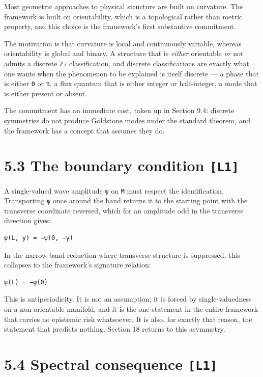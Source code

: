 \documentclass[
  11pt]{report}
\begin{document}
Most geometric approaches to physical structure are built on curvature.
The framework is built on orientability, which is a topological rather
than metric property, and this choice is the framework's first
substantive commitment.

The motivation is that curvature is local and continuously variable,
whereas orientability is global and binary. A structure that is
\emph{either} orientable \emph{or} not admits a discrete \texttt{ℤ₂}
classification, and discrete classifications are exactly what one wants
when the phenomenon to be explained is itself discrete --- a phase that
is either \texttt{0} or \texttt{π}, a flux quantum that is either
integer or half-integer, a mode that is either present or absent.

The commitment has an immediate cost, taken up in Section 9.4: discrete
symmetries do not produce Goldstone modes under the standard theorem,
and the framework has a concept that assumes they do.

\hypertarget{the-boundary-condition-l1}{%
\section{\texorpdfstring{5.3 The boundary condition
\texttt{{[}L1{]}}}{5.3 The boundary condition {[}L1{]}}}\label{the-boundary-condition-l1}}

A single-valued wave amplitude \texttt{ψ} on \texttt{M} must respect the
identification. Transporting \texttt{ψ} once around the band returns it
to the starting point with the transverse coordinate reversed, which for
an amplitude odd in the transverse direction gives:

\begin{verbatim}
ψ(L, y) = −ψ(0, −y)
\end{verbatim}

In the narrow-band reduction where transverse structure is suppressed,
this collapses to the framework's signature relation:

\begin{verbatim}
ψ(L) = −ψ(0)
\end{verbatim}

This is antiperiodicity. It is not an assumption; it is forced by
single-valuedness on a non-orientable manifold, and it is the one
statement in the entire framework that carries no epistemic risk
whatsoever. It is also, for exactly that reason, the statement that
predicts nothing. Section 18 returns to this asymmetry.

\hypertarget{spectral-consequence-l1}{%
\section{\texorpdfstring{5.4 Spectral consequence
\texttt{{[}L1{]}}}{5.4 Spectral consequence {[}L1{]}}}\label{spectral-consequence-l1}}
\end{document}
